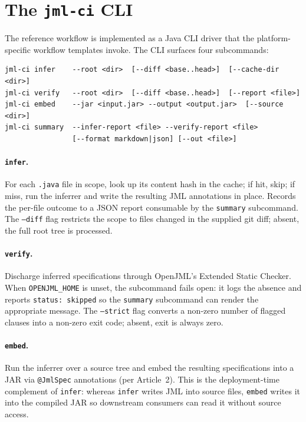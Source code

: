 \section{The \texttt{jml-ci} CLI}
\label{sec:cli}

The reference workflow is implemented as a Java CLI driver that the platform-specific workflow templates invoke. The CLI surfaces four subcommands:

\begin{lstlisting}[language={}]
jml-ci infer    --root <dir>  [--diff <base..head>]  [--cache-dir <dir>]
jml-ci verify   --root <dir>  [--diff <base..head>]  [--report <file>]
jml-ci embed    --jar <input.jar> --output <output.jar>  [--source <dir>]
jml-ci summary  --infer-report <file> --verify-report <file>
                [--format markdown|json] [--out <file>]
\end{lstlisting}

\paragraph{\texttt{infer}.}
For each {\tt .java} file in scope, look up its content hash in the cache; if hit, skip; if miss, run the inferrer and write the resulting JML annotations in place. Records the per-file outcome to a JSON report consumable by the \texttt{summary} subcommand. The {\tt --diff} flag restricts the scope to files changed in the supplied git diff; absent, the full root tree is processed.

\paragraph{\texttt{verify}.}
Discharge inferred specifications through OpenJML's Extended Static Checker. When {\tt OPENJML\_HOME} is unset, the subcommand fails open: it logs the absence and reports {\tt status: skipped} so the {\tt summary} subcommand can render the appropriate message. The {\tt --strict} flag converts a non-zero number of flagged clauses into a non-zero exit code; absent, exit is always zero.

\paragraph{\texttt{embed}.}
Run the inferrer over a source tree and embed the resulting specifications into a JAR via {\tt @JmlSpec} annotations (per Article~2). This is the deployment-time complement of {\tt infer}: whereas {\tt infer} writes JML into source files, {\tt embed} writes it into the compiled JAR so downstream consumers can read it without source access.

